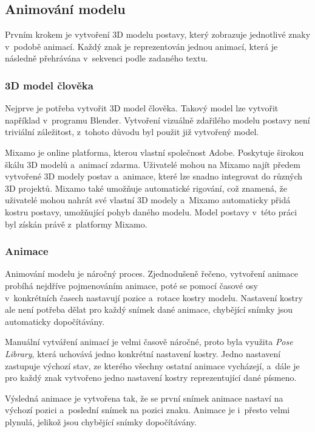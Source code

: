 \documentclass[
  master,
  program=ainfvs,
  biblatex,
  figures=true,
  tables=false,
  sourcecodes=true,
  glossaries,
  index
]{kidiplom}
\begin{document}
      
    \subsection{Animování modelu}
        Prvním krokem je vytvoření 3D modelu postavy, který zobrazuje jednotlivé znaky v~podobě animací. Každý znak je reprezentován jednou animací, která je následně přehrávána v~sekvenci podle zadaného textu.

        \subsubsection{3D model člověka}
            Nejprve je potřeba vytvořit 3D model člověka. Takový model lze vytvořit například v~programu Blender. Vytvoření vizuálně zdařilého modelu postavy není triviální záležitost, z~tohoto důvodu byl použit již vytvořený model.

            Mixamo \cite{mixamo} je online platforma, kterou vlastní společnost Adobe. Poskytuje širokou škálu 3D modelů a~animací zdarma. Uživatelé mohou na Mixamo najít předem vytvořené 3D modely postav a~animace, které lze snadno integrovat do různých 3D projektů. Mixamo také umožňuje automatické rigování, což znamená, že uživatelé mohou nahrát své vlastní 3D modely a~Mixamo automaticky přidá kostru postavy, umožňující pohyb daného modelu. Model postavy v~této práci byl získán právě z~platformy Mixamo. 
            
    
        \subsubsection{Animace}
            Animování modelu je náročný proces. Zjednodušeně řečeno, vytvoření animace probíhá nejdříve pojmenováním animace, poté se pomocí časové osy v~konkrétních časech nastavují pozice a~rotace kostry modelu. Nastavení kostry ale není potřeba dělat pro každý snímek dané animace, chybějící snímky jsou automaticky dopočítávány.

            Manuální vytváření animací je velmi časově náročné, proto byla využita \emph{Pose Library}, která uchovává jedno konkrétní nastavení kostry. Jedno nastavení zastupuje výchozí stav, ze kterého všechny ostatní animace vycházejí, a~dále je pro každý znak vytvořeno jedno nastavení kostry reprezentující dané písmeno. 
            
            Výsledná animace je vytvořena tak, že se první snímek animace nastaví na výchozí pozici a~poslední snímek na pozici znaku. Animace je i~přesto velmi plynulá, jelikož jsou chybějící snímky dopočítávány. 
            
\end{document}
